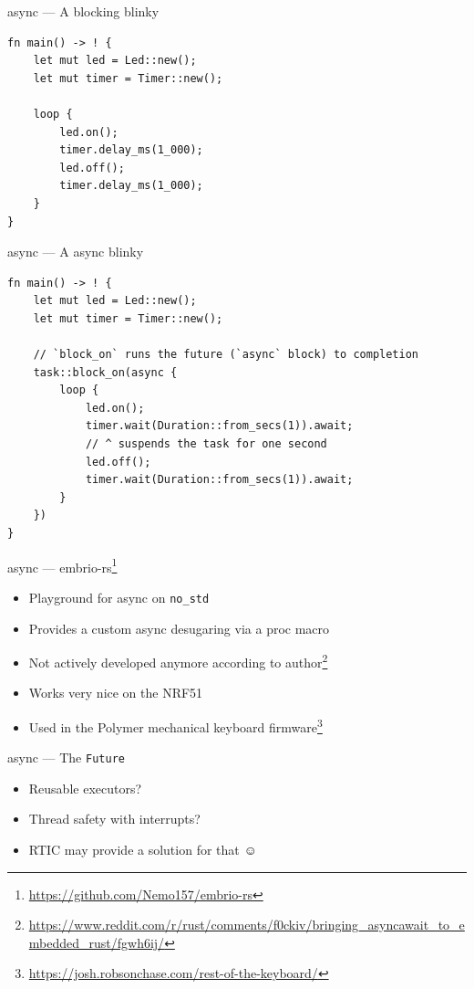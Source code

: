 \documentclass[aspectratio=1610,14pt,t]{beamer}
\begin{document}
\begin{frame}[c,fragile]{async --- A blocking blinky}
  \begin{verbatim}
fn main() -> ! {
    let mut led = Led::new();
    let mut timer = Timer::new();

    loop {
        led.on();
        timer.delay_ms(1_000);
        led.off();
        timer.delay_ms(1_000);
    }
}
  \end{verbatim}
\end{frame}

\begin{frame}[c,fragile]{async --- A async blinky}
  \begin{verbatim}
fn main() -> ! {
    let mut led = Led::new();
    let mut timer = Timer::new();

    // `block_on` runs the future (`async` block) to completion
    task::block_on(async {
        loop {
            led.on();
            timer.wait(Duration::from_secs(1)).await;
            // ^ suspends the task for one second
            led.off();
            timer.wait(Duration::from_secs(1)).await;
        }
    })
}
  \end{verbatim}
\end{frame}



\begin{frame}[c]{async --- embrio-rs\footnote{\url{https://github.com/Nemo157/embrio-rs}}}
  \begin{itemize}
    \item Playground for async on \texttt{no\_std}
    \item Provides a custom async desugaring via a proc macro
    \item Not actively developed anymore according to author\footnote{\url{https://www.reddit.com/r/rust/comments/f0ckiv/bringing_asyncawait_to_embedded_rust/fgwh6ij/}}
    \item Works very nice on the NRF51
    \item Used in the Polymer mechanical keyboard firmware\footnote{\url{https://josh.robsonchase.com/rest-of-the-keyboard/}}
  \end{itemize}
\end{frame}

\begin{frame}[c]{async --- The \texttt{Future}}
  \begin{itemize}
    \item Reusable executors?
    \item Thread safety with interrupts?
    \pause\item RTIC may provide a solution for that {\DejaVu ☺}
  \end{itemize}
\end{frame}
\end{document}
